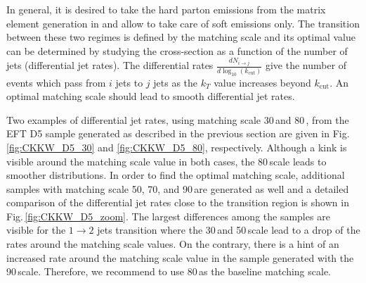  In general, it is desired to take the hard parton emissions from the matrix element generation in \madgraph and allow \pythiaEight to take care of soft emissions only. The transition between these two regimes is defined by the matching scale and its optimal value can be determined by studying the cross-section as a function of the number of jets (differential jet rates). The differential rates $\frac{dN_{i\to j}}{d \log_{10}(k_\textrm{cut})}$ give the number of events which pass from $i$ jets to $j$ jets as the $k_T$ value increases beyond $k_\textrm{cut}$. An optimal matching scale should lead to smooth differential jet rates.

 Two examples of differential jet rates, using matching scale 30\,\gev and 80\,\gev, from the EFT D5 sample generated as described in the previous section are given in Fig.\,\ref{fig:CKKW_D5_30} and \ref{fig:CKKW_D5_80}, respectively.
 Although a kink is visible around the matching scale value in both cases, the 80\,\gev scale leads to smoother distributions. 
 In order to find the optimal matching scale, additional samples with matching scale 50, 70, and 90\,\gev are generated as well and a detailed comparison of the differential jet rates close to the transition region is shown in Fig.\,\ref{fig:CKKW_D5_zoom}.
 The largest differences among the samples are visible for the $1\rightarrow2$ jets transition where the 30\,\gev and 50\,\gev scale lead to a drop of the rates around the matching scale values. On the contrary, there is a hint of an increased rate around the matching scale value in the sample generated with the 90\,\gev scale. Therefore, we recommend to use 80\,\gev as the baseline matching scale.


